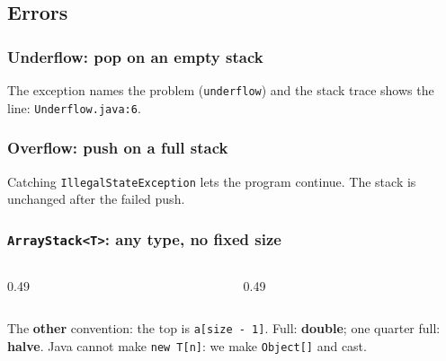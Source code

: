 \documentclass[aspectratio=169,10pt,compress]{beamer}
\begin{document}
\subsection[Errors]{Errors}




\begin{frame}[t,fragile] \frametitle{Underflow: pop on an empty stack}

  \vspace{0.2em}
  \small The exception names the problem (\texttt{underflow}) and the stack trace shows the line: \texttt{Underflow.java:6}.
\end{frame}




\begin{frame}[t,fragile] \frametitle{Overflow: push on a full stack}

  \vspace{0.2em}
  \small Catching \texttt{IllegalStateException} lets the program continue. The stack is unchanged after the failed push.
\end{frame}





\begin{frame}[t,fragile] \frametitle{\texttt{ArrayStack<T>}: any type, no fixed size}
  \begin{columns}[T]
    \begin{column}{0.49\textwidth}
    \end{column}
    \begin{column}{0.49\textwidth}
    \end{column}
  \end{columns}
  \small The \textbf{other} convention: the top is \texttt{a[size - 1]}. Full: \textbf{double}; one quarter full: \textbf{halve}.
  Java cannot make \texttt{new T[n]}: we make \texttt{Object[]} and cast.
\end{frame}
\end{document}
